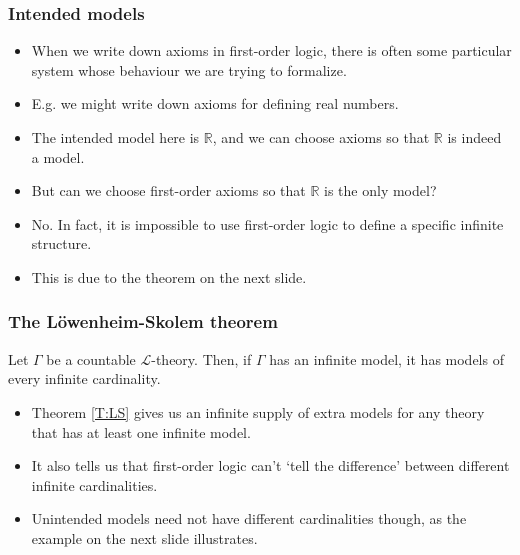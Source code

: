 \documentclass[handout]{beamer}
\newcommand{\sL}{\mathscr{L}}
\newcommand{\bR}{\mathbb{R}}
\begin{document}
\begin{frame}
\frametitle{Intended models}
\begin{itemize}
\item When we write down axioms in first-order logic, there is often some particular system whose behaviour we are trying to formalize.
\vspace{0.3cm}
\item E.g. we might write down axioms for defining real numbers.
\vspace{0.3cm}
\item The intended model here is $\bR$, and we can choose axioms so that $\bR$ is indeed a model.
\vspace{0.3cm}
\item But can we choose first-order axioms so that $\bR$ is the only model? 
\vspace{0.3cm}
\item No. In fact, it is impossible to use first-order logic to define a specific infinite structure.
\vspace{0.3cm}
\item This is due to the theorem on the next slide.
\end{itemize}
\end{frame}

\begin{frame}
\frametitle{The L\"owenheim-Skolem theorem}
\begin{theorem}\label{T:LS}
Let $\Gamma$ be a countable $\sL$-theory. Then, if $\Gamma$ has an infinite model, it has models of every infinite cardinality.
\end{theorem}
\vspace{1cm}
\begin{itemize}
\item Theorem \ref{T:LS} gives us an infinite supply of extra models for any theory that has at least one infinite model. \vspace{0.5cm}
\item It also tells us that first-order logic can't `tell the difference' between different infinite cardinalities. \vspace{0.5cm}
\item Unintended models need not have different cardinalities though, as the example on the next slide illustrates.
\end{itemize}
\end{frame}
\end{document}
